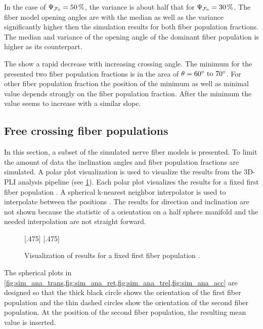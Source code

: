 In the case of $\textnormal{$\Psi_{\textnormal{$\mathcal{F}_0$}}$}=\SI{50}{\percent}$, the variance is about half that for $\textnormal{$\Psi_{\textnormal{$\mathcal{F}_0$}}$}=\SI{30}{\percent}$.
The fiber model opening angles are with the median as well as the \bvariance{} variance significantly higher then the simulation results for both fiber population fractions.
The median and \bvariance{} variance of the opening angle of the dominant fiber population is higher as its counterpart.
\par
The \accvalue{} show a rapid decrease with increasing crossing angle.
The minimum for the presented two fiber population fractions is in the area of $\modelOmega = \SIrange{60}{70}{\degree}$.
For other fiber population fraction the position of the minimum as well as minimal value depends strongly on the fiber population fraction.
After the minimum the value seems to increase with a similar slope.
%
% 
% 
\subsection{Free crossing fiber populations}
\label{sec:resFreeCross}
% 
%
In this section, a subset of the simulated nerve fiber models is presented.
To limit the amount of data the inclination angles \dummy{} and fiber population fractions \dummy{} are simulated.
A polar plot visualization is used to visualize the results from the \ac{3D-PLI} analysis pipeline (see \cref{fig:simModelSphereSample}).
Each polar plot visualizes the results for a fixed first fiber population \popa{}.
A spherical k-nearest neighbor interpolator is used to interpolate between the positions \cite{DBLP:journals/corr/abs-1910-00704}.
The results for direction and inclination are not shown because the statistic of a orientation on a half sphere manifold and the needed interpolation are not straight forward.
% 
\begin{figure}[t]
\centering
\setlength{\tikzwidth}{0.40\textwidth}
[.475\textwidth]{}
\hfill
{}
[.475\textwidth]{}
\caption{Visualization of results for a fixed first fiber population \popa{}.}
\label{fig:simModelSphereSample}
\end{figure}
%
The spherical plots in \cref{fig:sim_ana_trans,fig:sim_ana_ret,fig:sim_ana_trel,fig:sim_ana_acc} are designed so that the thick black circle shows the orientation of the first fiber population and the thin dashed circles show the orientation of the second fiber population.
At the position of the second fiber population, the resulting mean value is inserted.
%
%
%
